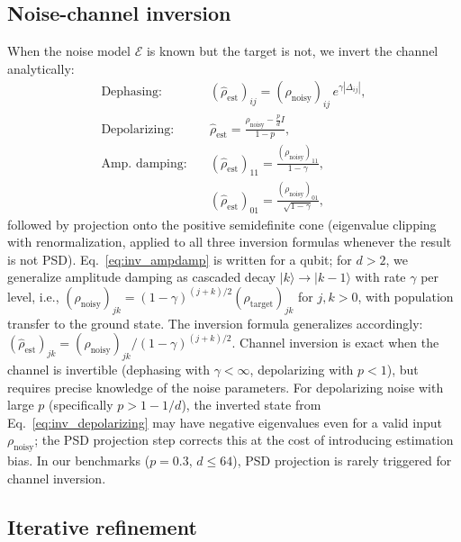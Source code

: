 \documentclass[pra,twocolumn,superscriptaddress,longbibliography,floatfix,nofootinbib]{revtex4-2}
\newcommand{\EE}{\mathcal{E}}
\newcommand{\rhot}{\rho_\mathrm{target}}
\newcommand{\rhon}{\rho_\mathrm{noisy}}
\newcommand{\rhoe}{\hat{\rho}_\mathrm{est}}
\begin{document}
\subsection{Noise-channel inversion}
\label{sec:inversion}

When the noise model $\EE$ is known but the target is not, we invert the channel analytically:
\begin{align}
\text{Dephasing:}\quad & (\rhoe)_{ij} = (\rhon)_{ij}\,e^{\gamma|\Delta_{ij}|}, \label{eq:inv_dephasing}\\
\text{Depolarizing:}\quad & \rhoe = \frac{\rhon - \frac{p}{d}I}{1-p}, \label{eq:inv_depolarizing}\\
\text{Amp.\ damping:}\quad & (\rhoe)_{11} = \frac{(\rhon)_{11}}{1-\gamma}, \nonumber\\
 & (\rhoe)_{01} = \frac{(\rhon)_{01}}{\sqrt{1-\gamma}}, \label{eq:inv_ampdamp}
\end{align}
followed by projection onto the positive semidefinite cone (eigenvalue clipping with renormalization, applied to all three inversion formulas whenever the result is not PSD).
Eq.~\eqref{eq:inv_ampdamp} is written for a qubit; for $d > 2$, we generalize amplitude damping as cascaded decay $|k\rangle \to |k-1\rangle$ with rate $\gamma$ per level, i.e., $(\rhon)_{jk} = (1-\gamma)^{(j+k)/2} (\rhot)_{jk}$ for $j,k > 0$, with population transfer to the ground state.
The inversion formula generalizes accordingly: $(\rhoe)_{jk} = (\rhon)_{jk} / (1-\gamma)^{(j+k)/2}$.
Channel inversion is exact when the channel is invertible (dephasing with $\gamma < \infty$, depolarizing with $p < 1$), but requires precise knowledge of the noise parameters.
For depolarizing noise with large $p$ (specifically $p > 1 - 1/d$), the inverted state from Eq.~\eqref{eq:inv_depolarizing} may have negative eigenvalues even for a valid input $\rhon$; the PSD projection step corrects this at the cost of introducing estimation bias.
In our benchmarks ($p = 0.3$, $d \leq 64$), PSD projection is rarely triggered for channel inversion.


\subsection{Iterative refinement}
\label{sec:iterative}
\end{document}
